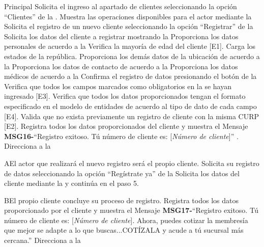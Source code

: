 	\begin{UCtrayectoria}{Principal}
		\UCpaso[\UCactor] Solicita el ingreso al apartado de clientes seleccionando la opción ``Clientes'' de la  .
		\UCpaso Muestra las operaciones disponibles para el actor mediante la 
		\UCpaso[\UCactor] Solicita el registro de un nuevo cliente seleccionando la opción ``Registrar'' de la 
		\UCpaso Solicita los datos del cliente a registrar mostrando la 
		\UCpaso[\UCactor] Proporciona los datos personales de acuerdo a la 
		\UCpaso Verifica la mayoría de edad del cliente [E1].
		\UCpaso Carga los estados de la república.
		\UCpaso[\UCactor] Proporciona los demás datos de la ubicación de acuerdo a la 
		\UCpaso[\UCactor] Proporciona los datos de contacto de acuerdo a la 
		\UCpaso[\UCactor] Proporciona los datos médicos de acuerdo a la 
		\UCpaso[\UCactor] Confirma el registro de datos presionando el botón  de la 
		\UCpaso Verifica que todos los campos marcados como obligatorios en la  se hayan ingresado [E3].
		\UCpaso Verifica que todos los datos proporcionados tengan el formato especificado en el modelo de entidades de acuerdo al tipo de dato de cada campo [E4].
		\UCpaso Valida que no exista previamente un registro de cliente con la misma CURP [E2].
		\UCpaso Registra todos los datos proporcionados del cliente y muestra el Mensaje {\bf MSG16-}``Registro exitoso. Tú número de cliente es: [{\em Número de cliente}]'' .
		\UCpaso Direcciona a la 
\end{UCtrayectoria}

\begin{UCtrayectoriaA}{A}{El actor que realizará el nuevo registro será el propio cliente.}
			\UCpaso[\UCactor] Solicita su registro de datos seleccionando la opción ``Regístrate ya'' de la 
			\UCpaso Solicita los datos del cliente mediante la  y continúa en el paso 5.		
		\end{UCtrayectoriaA}
		
		\begin{UCtrayectoriaA}{B}{El propio cliente concluye su proceso de registro.}
			\UCpaso Registra todos los datos proporcionado por el cliente y muestra el Mensaje {\bf MSG17-}``Registro exitoso. Tú número de cliente es: [{\em Número de cliente}]. Ahora, puedes cotizar la membresía que mejor se adapte a lo que buscas...COTÍZALA y acude a tú sucursal más cercana.'' 
			\UCpaso Direcciona a la 
		\end{UCtrayectoriaA}


			
